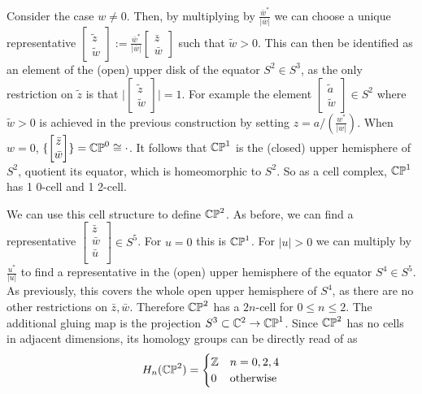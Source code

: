 Consider the case $w\neq 0$. Then, by multiplying by $\frac{\bar{w}^*}{|\bar{w}|}$ we can choose a unique representative $\begin{bmatrix} \tilde{z}\\ \tilde{w} \end{bmatrix}:= \frac{\bar{w}^*}{|\bar{w}|}\begin{bmatrix}\bar{z}\\ \bar{w} \end{bmatrix}$ such that $\tilde{w}> 0$. This can then be identified as an element of the (open) upper disk of the equator $S^2\in S^3$, as the only restriction on $\tilde{z}$ is that $\big|\begin{bmatrix}\tilde{z}\\ \tilde{w} \end{bmatrix} \big|=1$. For example the element $\begin{bmatrix}\tilde{a} \\ \tilde{w}\end{bmatrix} \in S^2$ where $\tilde{w}>0$ is achieved in the previous construction by setting $z=a/(\frac{w^*}{|w|})$. When $w=0$, $\{\begin{bmatrix} \bar{z}\\ \bar{w} \end{bmatrix}\}=\mathbb{CP}^{0}\cong \cdot$. It follows that $\mathbb{CP}^{1}$ is the (closed) upper hemisphere of $S^2$, quotient its equator, which is homeomorphic to $S^2$. So as a cell complex, $\mathbb{CP}^{1}$ has 1 0-cell and 1 2-cell.

We can use this cell structure to define $\mathbb{CP}^{2}$. As before, we can find a representative $\begin{bmatrix}\bar{z}\\ \bar{w}\\ \bar{u}\\ \end{bmatrix}\in S^5$. For $u=0$ this is $\mathbb{CP}^{1}$. For $|u|>0$ we can multiply by $\frac{u^*}{|u|}$ to find a representative in the (open) upper hemisphere of the equator $S^4\in S^5$. As previously, this covers the whole open upper hemisphere of $S^4$, as there are no other restrictions on $\bar{z},\bar{w}$. Therefore $\mathbb{CP}^{2}$ has a $2n$-cell for $0\leq n \leq 2$. The additional gluing map is the projection $S^3\subset \mathbb{C}^2 \rightarrow \mathbb{CP}^{1}$. Since $\mathbb{CP}^{2}$ has no cells in adjacent dimensions, its homology groups can be directly read of as $$H_n(\mathbb{CP}^{2})=\begin{cases}\mathbb{Z} & n=0,2,4\\ 0 & \text{otherwise}\end{cases}$$

